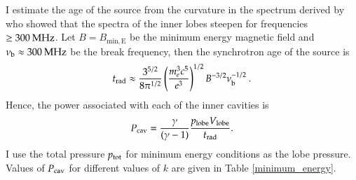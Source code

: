 I estimate the age of the source from the curvature in the spectrum derived by \citet{cotton09} who showed that the spectra of the inner lobes steepen for frequencies $\geq 300 \> \rm MHz$. Let $B=B_\mathrm{min,E}$ be the minimum energy magnetic field and $\nu_{\rm{b}} \approx 300 \> \rm MHz$ be the break frequency, then the synchrotron age of the source is 
\begin{equation}
t_{\rm{rad}} \approx \frac{3^{5/2}}{8 {\pi}^{1/2}} \left(\frac{m_e^3 c^5}{e^3}\right)^{1/2} B^{-3/2}\nu_{\rm{b}}^{-1/2}\:.
\end{equation}
Hence, the power associated with each of the inner cavities is 
\begin{equation}
P_{\rm cav} = \frac{\gamma}{(\gamma -1)} \frac{p_{\rm lobe} V_{\rm lobe}}{t_{\rm rad}}.
\label{p_cav}
\end{equation}
I use the total pressure $p_{\rm{tot}}$ for minimum energy conditions as the lobe pressure. Values of $P_{\rm{cav}}$ for different values of $k$ are given in Table \ref{minimum_energy}.



%
%


